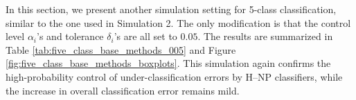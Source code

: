 








In this section, we present another simulation setting for 5-class classification, similar to the one used in Simulation 2. The only modification is that the control level $\alpha_i$'s and tolerance $\delta_i$'s are all set to $0.05$. The results are summarized in Table \ref{tab:five_class_base_methods_005} and Figure \ref{fig:five_class_base_methods_boxplots}. This simulation again confirms the high-probability control of under-classification errors by H--NP classifiers, while the increase in overall classification error remains mild.













